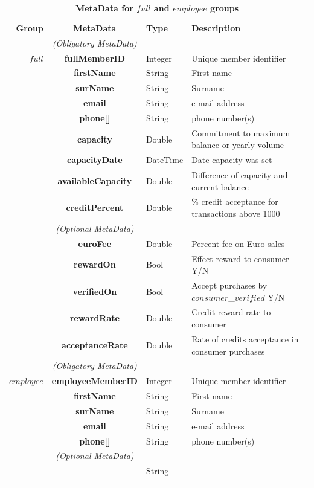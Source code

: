 \begin{table}[H]
\begin{centering}
\small
{
\begin{tabular}{ r | c | l | l }
\textbf{Group}	& {\bf MetaData} & {\bf Type} & {\bf Description} \\
\Xhline{1.5pt}
			& \emph{(Obligatory MetaData)} & & \\
\cline{2-2}
$full$		& {\bf fullMemberID}			&Integer & Unique member identifier \\
			& {\bf firstName}			&String & First name \\
			& {\bf surName}			&String & Surname \\
			& {\bf email}				&String & e-mail address \\
			& {\bf phone[]}				&String	& phone number(s) \\
			& {\bf capacity}				&Double & Commitment to maximum balance or yearly volume \\
			& {\bf capacityDate}			&DateTime & Date capacity was set \\
			& {\bf availableCapacity}		&Double & Difference of capacity and current balance \\
			& {\bf creditPercent}			&Double & \% credit acceptance for transactions above 1000 \\
\cline{2-2}
			 & \emph{(Optional MetaData)}& & \\
\cline{2-2}
			& {\bf euroFee}				&Double & Percent fee on Euro sales \\
			& {\bf rewardOn}			&Bool & Effect reward to consumer Y/N \\
			& {\bf verifiedOn}			&Bool & Accept purchases by $consumer$\_$verified$ Y/N \\
			& {\bf rewardRate}			&Double & Credit reward rate to consumer \\
			& {\bf acceptanceRate}		&Double & Rate of credits acceptance in consumer purchases\\
\Xhline{1.5pt}
			& \emph{(Obligatory MetaData)} & & \\
\cline{2-2}
$employee$	& {\bf employeeMemberID}	&Integer	& Unique member identifier \\
			& {\bf firstName}			&String	& First name \\
			& {\bf surName}			&String	& Surname \\
			& {\bf email}				&String	& e-mail address \\
			& {\bf phone[]}				&String	& phone number(s) \\
\cline{2-2}
			 & \emph{(Optional MetaData)}& & \\
\cline{2-2}
			& {\bf }				&String &  \\
\Xhline{1.5pt}
\end{tabular}
}
\caption{\small\textbf{MetaData  for $full$ and $employee$ groups}}
\label{tab:GroupMetaData}
\end{centering}
\end{table}

